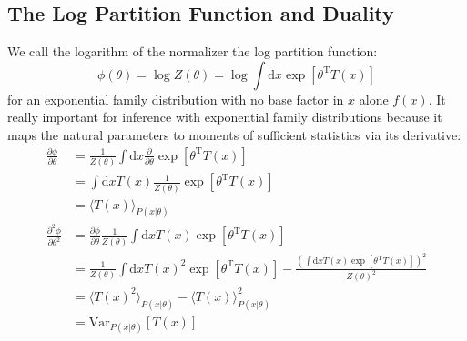 \documentclass[a4paper]{article}
\begin{document}
\subsection{The Log Partition Function and Duality} \label{expfam duality}
We call the logarithm of the normalizer the log partition function: 
\[ \phi(\theta) = \log Z(\theta) = \log \int \textrm{d}x \exp[\theta^\textrm{T}T(x)] \]
for an exponential family distribution with no base factor in $x$ alone $f(x)$. It really important for inference with exponential family distributions because it maps the natural parameters to moments of sufficient statistics via its derivative:
\begin{align*}
\frac{\partial \phi}{\partial \theta} &= \frac{1}{Z(\theta)}\int \textrm{d}x \frac{\partial}{\partial \theta}\exp[\theta^\textrm{T}T(x)] \\
&= \int \textrm{d}x T(x)\frac{1}{Z(\theta)}\exp[\theta^\textrm{T}T(x)] \\
&= \langle T(x) \rangle_{P(x|\theta)} \\
\frac{\partial^2 \phi}{\partial \theta^2} &= \frac{\partial \phi}{\partial \theta} \frac{1}{Z(\theta)}\int \textrm{d}x T(x)\exp[\theta^\textrm{T}T(x)] \\
&= \frac{1}{Z(\theta)}\int \textrm{d}x T(x)^2\exp[\theta^\textrm{T}T(x)] - \frac{\left(\int \textrm{d}x T(x)\exp[\theta^\textrm{T}T(x)]\right)^2}{Z(\theta)^2} \\
&= \langle T(x)^2 \rangle_{P(x|\theta)} - \langle T(x) \rangle_{P(x|\theta)}^2 \\ 
&= \textrm{Var}_{P(x|\theta)}[T(x)]
\end{align*}
\end{document}
